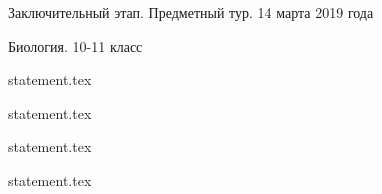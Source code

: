 \documentclass[a4paper,11pt, oneside]{book}
\begin{document}
\vspace{-3mm}
\vspace{-5mm}

\normalsize

\begin{center}
    Заключительный этап. Предметный тур. 14 марта 2019 года
    
    Биология. 10-11 класс
\end{center}

\parindent=0cm

{statement.tex}

\newpage

{statement.tex}

{statement.tex}

\newpage

{statement.tex}
\end{document}
